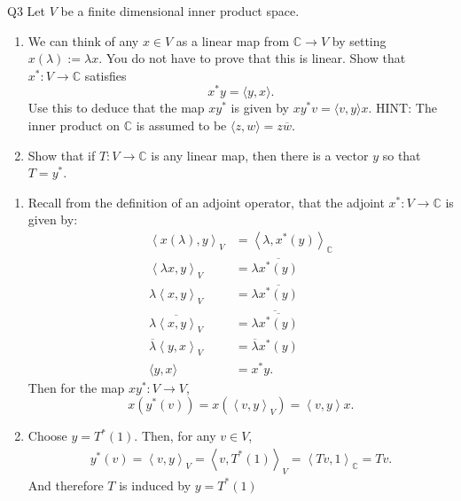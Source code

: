 \documentclass{article}
\begin{document}
\begin{prob}{Q3}
Let $V$ be a finite dimensional inner product space.
\begin{enumerate}[label= (\alph*)] 
\item We can think of any $x \in V$ as a linear map from $\mathbb{C} \to V$ by setting $x(\lambda) := \lambda x$. You do not have to prove that this is linear. Show that $x^*: V \to \mathbb{C}$ satisfies
$$x^* y = \langle y, x\rangle.$$
Use this to deduce that the map $xy^*$ is given by $xy^* v = \langle v, y\rangle x$.
HINT: The inner product on $\mathbb{C}$ is assumed to be $\langle z, w\rangle = z\overline{w}$.
\item Show that if $T: V \to \mathbb{C}$ is any linear map, then there is a vector $y$ so that $T = y^*$.
\end{enumerate}
\end{prob}
\begin{enumerate}[label= (\alph*)] 
    \item Recall from the definition of an adjoint operator, that the adjoint $x^* :V\to \mathbb{C}$ is given by:
        \begin{align*}
            \left< x(\lambda),y \right>_V &=\left<\lambda,x^* (y) \right>_{\mathbb{C}}\\
            \left<\lambda x,y \right>_V&= \lambda \overline{x^* (y)} \\
            \lambda\left< x,y \right>_V&= \lambda \overline{x^* (y)} \\
            \overline{\lambda\left< x,y \right>_V}&= \overline{\lambda \overline{x^* (y)}} \\
            \overline{\lambda}\left< y,x \right>_V&= \overline{\lambda} {x^* (y)} \\
            \langle y, x\rangle&= x^* y
        .\end{align*}
        Then for the map $xy^* :V\to V$, 
        \[
            x(y^* (v))=x(\left<v,y \right>_V)=\left<v,y \right> x
        .\] 
    \item Choose $y=T^* (1).$ Then, for any $v\in V$, 
        \begin{align*}
            y^* (v)=\left<v,y \right>_V=\left<v,T^* (1) \right>_V = \left<Tv,1 \right>_{\mathbb{C}}=Tv
        .\end{align*}
        And therefore $T$ is induced by $y=T^* (1)$
\end{enumerate}
\end{document}
